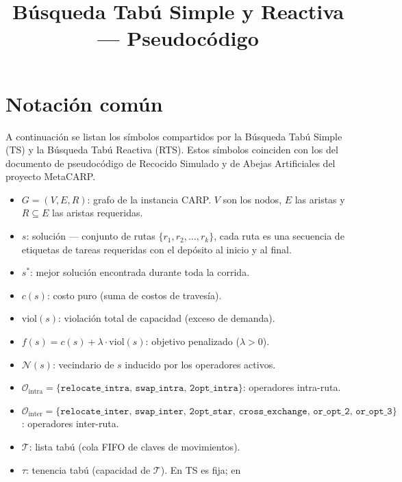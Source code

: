 \documentclass[12pt, a4paper]{article}
\title{Búsqueda Tabú Simple y Reactiva --- Pseudocódigo}
\author{}
\date{}
\begin{document}
\maketitle

\section{Notación común}

A continuación se listan los símbolos compartidos por la Búsqueda Tabú Simple
(TS) y la Búsqueda Tabú Reactiva (RTS). Estos símbolos coinciden con los del
documento de pseudocódigo de Recocido Simulado y de Abejas Artificiales del
proyecto MetaCARP.

\begin{itemize}
    \item $G = (V, E, R)$: grafo de la instancia CARP. $V$ son los nodos, $E$ las
          aristas y $R \subseteq E$ las aristas requeridas.
    \item $s$: solución --- conjunto de rutas $\{r_1, r_2, \ldots, r_k\}$, cada
          ruta es una secuencia de etiquetas de tareas requeridas con el depósito
          al inicio y al final.
    \item $s^{*}$: mejor solución encontrada durante toda la corrida.
    \item $c(s)$: costo puro (suma de costos de travesía).
    \item $\mathrm{viol}(s)$: violación total de capacidad (exceso de demanda).
    \item $f(s) = c(s) + \lambda \cdot \mathrm{viol}(s)$: objetivo penalizado
          ($\lambda > 0$).
    \item $\mathcal{N}(s)$: vecindario de $s$ inducido por los operadores
          activos.
    \item $\mathcal{O}_{\mathrm{intra}} = \{\texttt{relocate\_intra},\,
          \texttt{swap\_intra},\, \texttt{2opt\_intra}\}$: operadores
          intra-ruta.
    \item $\mathcal{O}_{\mathrm{inter}} = \{\texttt{relocate\_inter},\,
          \texttt{swap\_inter},\, \texttt{2opt\_star},\,
          \texttt{cross\_exchange},\, \texttt{or\_opt\_2},\,
          \texttt{or\_opt\_3}\}$: operadores inter-ruta.
    \item $\mathcal{T}$: lista tabú (cola FIFO de claves de movimientos).
    \item $\tau$: tenencia tabú (capacidad de $\mathcal{T}$). En TS es fija; en

\end{itemize}
\end{document}
